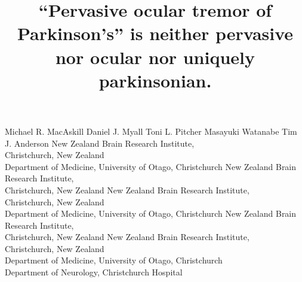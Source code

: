 \documentclass[jou,a4paper]{apa6}
\begin{document}
\newcommand{\jemrVolume}{x}
\newcommand{\jemrIssue}{y}
\newcommand{\jemrArticle}{z}
\newcommand{\jemrLastPage}{\pageref{LastPage}}
\newcommand{\jemrReceivedDate}{Mmm dd, 2016}
\newcommand{\jemrPublishedDate}{Mmm dd, 2016}
\newcommand{\jemrShortTitle}{``Ocular tremor'' in Parkinson's disease}


\title{``Pervasive ocular tremor of Parkinson's'' is neither pervasive nor ocular nor uniquely parkinsonian.}
\fiveauthors
	{Michael R. MacAskill}
	{Daniel J. Myall}
	{Toni L. Pitcher}
	{Masayuki Watanabe}
	{Tim J. Anderson}
\fiveaffiliations
    {New Zealand Brain Research Institute,\\Christchurch, New Zealand\\
    Department of Medicine, University of Otago, Christchurch}
    {New Zealand Brain Research Institute,\\Christchurch, New Zealand}
    {New Zealand Brain Research Institute,\\Christchurch, New Zealand\\
    Department of Medicine, University of Otago, Christchurch}
	{New Zealand Brain Research Institute,\\Christchurch, New Zealand}
    {New Zealand Brain Research Institute,\\Christchurch, New Zealand\\
    Department of Medicine, University of Otago, Christchurch\\
    Department of Neurology, Christchurch Hospital}
\end{document}
